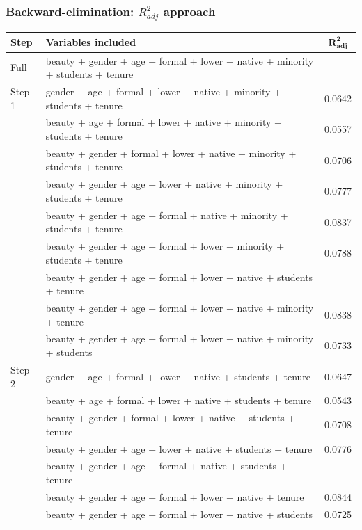 \begin{frame}[shrink]
\frametitle{Backward-elimination: $R^2_{adj}$ approach}

\vspace{-0.15cm}

{\tiny
\begin{tabular}{l | l | c}
\textbf{Step}		& \textbf{Variables included}	& $\mathbf{R^2_{adj}}$ \\
\hline
Full		& beauty + gender + age + formal + lower + native + minority + students + tenure & \red{0.0839} \pause \\
\hline
Step 1 	& gender + age + formal + lower + native + minority + students + tenure		& 0.0642 \\
		& beauty + age + formal + lower + native + minority + students + tenure		& 0.0557 \\
		& beauty + gender + formal + lower + native + minority + students + tenure	& 0.0706 \\
		& beauty + gender + age + lower + native + minority + students + tenure		& 0.0777 \\
		& beauty + gender + age + formal + native + minority + students + tenure		& 0.0837 \\
		& beauty + gender + age + formal + lower + minority + students + tenure		& 0.0788 \\
		& beauty + gender + age + formal + lower + native + students + tenure		& \red{0.0842} \\
		& beauty + gender + age + formal + lower + native + minority + tenure		& 0.0838 \\
		& beauty + gender + age + formal + lower + native + minority + students		& 0.0733 \pause \\
\hline		
Step 2	& gender + age + formal + lower + native + students + tenure 				& 0.0647 \\
		& beauty + age + formal + lower + native + students + tenure 				& 0.0543 \\
		& beauty + gender + formal + lower + native + students + tenure 			& 0.0708 \\
		& beauty + gender + age + lower + native + students + tenure 				&0.0776  \\
		& beauty + gender + age + formal + native + students + tenure 			& \red{0.0846} \\
		& beauty + gender + age + formal + lower + native + tenure 				& 0.0844 \\
		& beauty + gender + age + formal + lower + native + students 				& 0.0725 \pause \\

\end{tabular}}
\end{frame}

